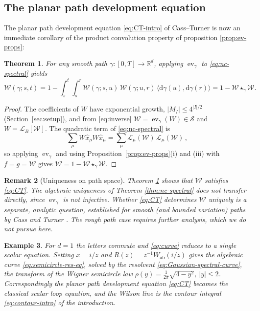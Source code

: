 \documentclass[11pt,a4paper]{article}
\newtheorem{theorem}{Theorem}[section]
\newtheorem{remark}[theorem]{Remark}
\newtheorem{example}[theorem]{Example}
\DeclareMathOperator{\ev}{ev}
\newcommand{\xh}{\hat{x}}
\newcommand{\cW}{\mathcal{W}}
\newcommand{\cL}{\mathcal{L}}
\newcommand{\dd}{\mathrm{d}}
\begin{document}
\subsection{The planar path development equation}\label{sec:CT}


The planar path development equation \eqref{eq:CT-intro} of Cass--Turner \cite{cass2026free} is now an immediate corollary of the product convolution property of proposition \ref{prop:ev-props}:


\begin{theorem}\label{thm:CT}
For any smooth path $\gamma\colon[0,T]\to\mathbb{R}^d$, applying $\ev_\gamma$ to \eqref{eq:nc-spectral} yields
\begin{equation}\label{eq:CT}
  \cW(\gamma;s,t) = 1 - \int_s^t\!\int_s^r
  \cW(\gamma;s,u)\,\cW(\gamma;u,r)\,
  \langle\dd\gamma(u),\dd\gamma(r)\rangle
  = 1 - \cW\star_\gamma\cW.
\end{equation}
\end{theorem}
\begin{proof}
The coefficients of $W$ have exponential growth, $|M_I|\leq 4^{|I|/2}$ (Section~\ref{sec:setup}), and from \eqref{eq:inverse} $\cW=\ev_\gamma(W)\in\mathcal S$ and $W=\cL_B[\cW]$. The quadratic term of \eqref{eq:nc-spectral} is
\begin{equation}
\sum_\mu W\xh_\mu W\xh_\mu=\sum_\mu\cL_\mu(\cW)\,\cL_\mu(\cW)\,,
\end{equation}
%
so applying $\ev_\gamma$ and using Proposition~\ref{prop:ev-props}(i) and (iii) with $f=g=\cW$ gives $\cW = 1 - \cW\star_\gamma\cW$.
\end{proof}


\begin{remark}[Uniqueness on path space]\label{rem:pathspace-uniqueness}
Theorem \ref{thm:CT} shows that $\cW$ satisfies \eqref{eq:CT}. The algebraic uniqueness of Theorem \ref{thm:nc-spectral} does not transfer directly, since $\ev_\gamma$ is not injective. Whether \eqref{eq:CT} determines $\cW$ uniquely is a separate, analytic question, established for smooth (and bounded variation) paths by Cass and Turner \cite{cass2026free}. The rough path case requires further analysis, which we do not pursue here.
\end{remark}

\begin{example}\label{ex:d1}
For $d=1$ the letters commute and \eqref{eq:curve} reduces to a single scalar equation. Setting $x=i/z$ and $R(z)=z^{-1}W_{\mathrm{ab}}(i/z)$ gives the algebraic curve \eqref{eq:semicircle-res-eq}, solved by the resolvent \eqref{eq:Gaussian-spectral-curve}, the transform of the Wigner semicircle law $\rho(y)=\tfrac{1}{2\pi}\sqrt{4-y^2}$, $|y|\leq2$. Correspondingly the planar path development equation \eqref{eq:CT} becomes the classical scalar loop equation, and the Wilson line is the contour integral \eqref{eq:contour-intro} of the introduction.
\end{example}
\end{document}
